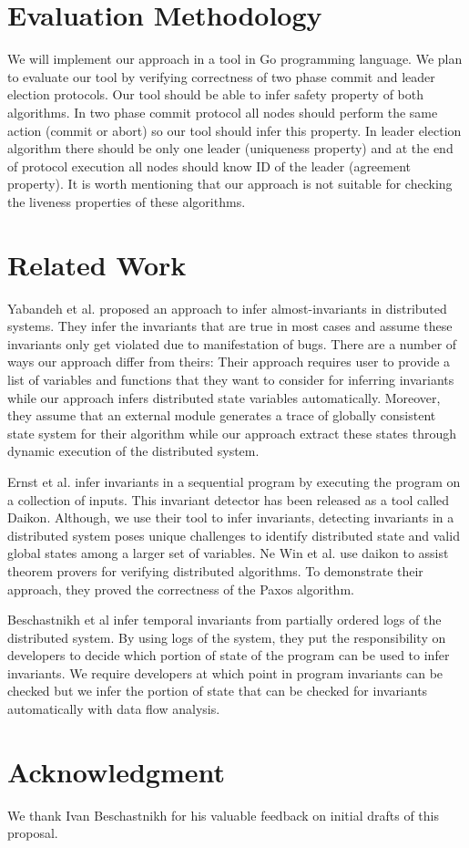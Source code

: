 \section{Evaluation Methodology}
We will implement our approach in a tool in Go programming language. We plan to evaluate our tool by verifying correctness of two phase commit and leader election protocols. Our tool should be able to infer safety property of both algorithms. In two phase commit protocol all nodes should perform the same action (commit or abort) so our tool should infer this property. In leader election algorithm there should be only one leader (uniqueness property) and at the end of protocol execution all nodes should know ID of the leader (agreement property). It is worth mentioning that our approach is not suitable for checking the liveness properties of these algorithms.

\section{Related Work}

Yabandeh et al.\cite{yabandeh2011finding} proposed an approach to
infer almost-invariants in distributed systems. They infer the
invariants that are true in most cases and assume these invariants
only get violated due to manifestation of bugs. There are a number of
ways our approach differ from theirs: Their approach requires user to
provide a list of variables and functions that they want to consider
for inferring invariants while our approach infers distributed state
variables automatically. Moreover, they assume that an external module
generates a trace of globally consistent state system for their
algorithm while our approach extract these states through dynamic
execution of the distributed system.

Ernst et al.\cite{ernst2001dynamically} infer invariants in a
sequential program by executing the program on a collection of inputs.
This invariant detector has been released as a tool called
Daikon\cite{ernst2007daikon}. Although, we use their tool to infer
invariants, detecting invariants in a distributed system poses unique
challenges to identify distributed state and valid global states among
a larger set of variables. Ne Win et al.\cite{NeWinEGKL04} use daikon
to assist theorem provers for verifying distributed algorithms. To
demonstrate their approach, they proved the correctness of the Paxos
algorithm.

Beschastnikh et al \cite{temporalInv} infer temporal invariants from partially ordered logs of the distributed system. By using logs of the system, they put the responsibility on developers to decide which portion of state of the program can be used to infer invariants. We require developers at which point in program invariants can be checked but we infer the portion of state that can be checked for invariants automatically with data flow analysis.


\section{Acknowledgment}
We thank Ivan Beschastnikh for his valuable feedback on initial drafts of this proposal.